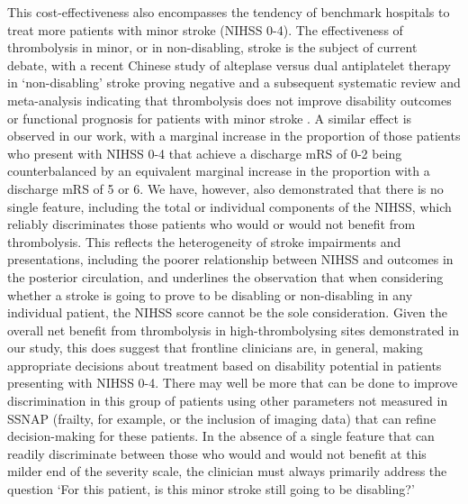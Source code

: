 This cost-effectiveness also encompasses the tendency of benchmark hospitals to treat more patients with minor stroke (NIHSS 0-4). The effectiveness of thrombolysis in minor, or in non-disabling, stroke is the subject of current debate, with a recent Chinese study of alteplase versus dual antiplatelet therapy in ‘non-disabling’ stroke\cite{chen_dual_2023} proving negative and a subsequent systematic review and meta-analysis indicating that thrombolysis does not improve disability outcomes or functional prognosis for patients with minor stroke \cite{zhang_intravenous_2024}. A similar effect is observed in our work, with a marginal increase in the proportion of those patients who present with NIHSS 0-4 that achieve a discharge mRS of 0-2 being counterbalanced by an equivalent marginal increase in the proportion with a discharge mRS of 5 or 6. We have, however, also demonstrated that there is no single feature, including the total or individual components of the NIHSS, which reliably discriminates those patients who would or would not benefit from thrombolysis. This reflects the heterogeneity of stroke impairments and presentations, including the poorer relationship between NIHSS and outcomes in the posterior circulation, and underlines the observation that when considering whether a stroke is going to prove to be disabling or non-disabling in any individual patient, the NIHSS score cannot be the sole consideration\cite{braksick_thrombolysis_2024}. Given the overall net benefit from thrombolysis in high-thrombolysing sites demonstrated in our study, this does suggest that frontline clinicians are, in general, making appropriate decisions about treatment based on disability potential in patients presenting with NIHSS 0-4. There may well be more that can be done to improve discrimination in this group of patients using other parameters not measured in SSNAP (frailty, for example, or the inclusion of imaging data) that can refine decision-making for these patients. In the absence of a single feature that can readily discriminate between those who would and would not benefit at this milder end of the severity scale, the clinician must always primarily address the question ‘For this patient, is this minor stroke still going to be disabling?’

